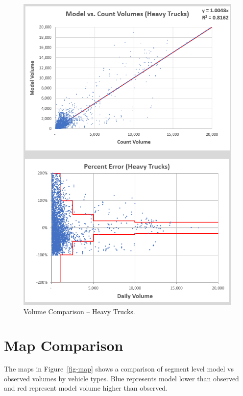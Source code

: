 \documentclass[
  letterpaper,
  DIV=11,
  numbers=noendperiod]{scrreprt}
\begin{document}
\begin{figure}[H]

{\centering \includegraphics[width=\textwidth,height=0.6\textheight]{v9x/v900/validation/_pictures/7-plot5.png}

}

\caption{\label{fig-hv-trucks}Volume Comparison -- Heavy Trucks.}

\end{figure}

\hypertarget{map-comparison}{%
\section{Map Comparison}\label{map-comparison}}

The maps in Figure~\ref{fig-map} shows a comparison of segment level
model vs observed volumes by vehicle types. Blue represents model lower
than observed and red represent model volume higher than observed.
\end{document}
